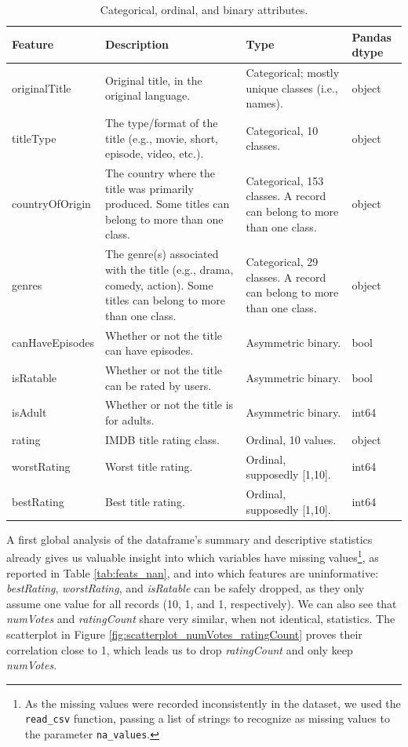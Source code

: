 \begin{table}[h]
    \centering
    \renewcommand{\arraystretch}{1.2}
    \scriptsize
    \begin{tabular}{|p{2cm}|p{4.5cm}|p{3cm}|p{1.5cm}|}  
        \hline
        \textbf{Feature} & \textbf{Description} & \textbf{Type} & \textbf{Pandas dtype} \\ \hline
        originalTitle & Original title, in the original language. & Categorical; mostly unique classes (i.e., names). & object \\ \hline
        titleType & The type/format of the title (e.g., movie, short, episode, video, etc.). & Categorical, 10 classes. & object \\ \hline
        countryOfOrigin & The country where the title was primarily produced. Some titles can belong to more than one class. & Categorical, 153 classes. A record can belong to more than one class. & object \\ \hline
        genres & The genre(s) associated with the title (e.g., drama, comedy, action). Some titles can belong to more than one class. & Categorical, 29 classes. A record can belong to more than one class. & object \\ \hline
        canHaveEpisodes & Whether or not the title can have episodes. & Asymmetric binary. & bool \\ \hline
        isRatable & Whether or not the title can be rated by users. & Asymmetric binary. & bool \\ \hline
        isAdult & Whether or not the title is for adults. & Asymmetric binary. & int64 \\ \hline
        rating & IMDB title rating class. & Ordinal, 10 values. & object \\ \hline
        worstRating & Worst title rating. & Ordinal, supposedly [1,10]. & int64 \\ \hline
        bestRating & Best title rating. & Ordinal, supposedly [1,10]. & int64 \\ \hline
    \end{tabular}
    \caption{Categorical, ordinal, and binary attributes.}
    \label{tab:original_vars_cat}
\end{table}

A first global analysis of the dataframe's summary and descriptive statistics already gives us valuable insight into which variables have missing values\footnote{As the missing values were recorded inconsistently in the dataset, we used the \texttt{read\_csv} function, passing a list of strings to recognize as missing values to the parameter \texttt{na\_values}.}, as reported in Table \ref{tab:feats_nan}, and into which features are uninformative: \textit{bestRating}, \textit{worstRating}, and \textit{isRatable} can be safely dropped, as they only assume one value for all records (10, 1, and 1, respectively). We can also see that \textit{numVotes} and \textit{ratingCount} share very similar, when not identical, statistics. The scatterplot in Figure \ref{fig:scatterplot_numVotes_ratingCount} proves their correlation close to 1, which leads us to drop \textit{ratingCount} and only keep \textit{numVotes}.

